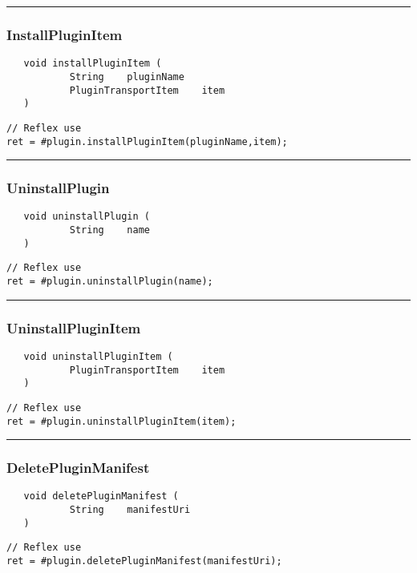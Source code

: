\rule{15cm}{2pt}
\subsubsection{InstallPluginItem}
\label{Api:InstallPluginItem}
\begin{verbatim}
   void installPluginItem (
           String    pluginName
           PluginTransportItem    item
   )
\end{verbatim}
\begin{lstlisting}[language=reflex]
// Reflex use
ret = #plugin.installPluginItem(pluginName,item);
\end{lstlisting}



\rule{15cm}{2pt}
\subsubsection{UninstallPlugin}
\label{Api:UninstallPlugin}
\begin{verbatim}
   void uninstallPlugin (
           String    name
   )
\end{verbatim}
\begin{lstlisting}[language=reflex]
// Reflex use
ret = #plugin.uninstallPlugin(name);
\end{lstlisting}



\rule{15cm}{2pt}
\subsubsection{UninstallPluginItem}
\label{Api:UninstallPluginItem}
\begin{verbatim}
   void uninstallPluginItem (
           PluginTransportItem    item
   )
\end{verbatim}
\begin{lstlisting}[language=reflex]
// Reflex use
ret = #plugin.uninstallPluginItem(item);
\end{lstlisting}



\rule{15cm}{2pt}
\subsubsection{DeletePluginManifest}
\label{Api:DeletePluginManifest}
\begin{verbatim}
   void deletePluginManifest (
           String    manifestUri
   )
\end{verbatim}
\begin{lstlisting}[language=reflex]
// Reflex use
ret = #plugin.deletePluginManifest(manifestUri);
\end{lstlisting}



